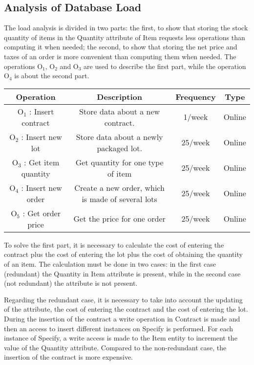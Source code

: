 \newpage
\subsection{Analysis of Database Load}
The load analysis is divided in two parts: the first, to show that storing the stock quantity of items in the Quantity attribute of Item requests less operations than computing it when needed; the second, to show that storing the net price and taxes of an order is more convenient than computing them when needed.
The operations $ \textrm{O}_\textrm{1} $, $ \textrm{O}_\textrm{2} $ and $ \textrm{O}_\textrm{3} $ are used to describe the first part, while the operation $ \textrm{O}_\textrm{4} $ is about the second part.
\begin{table}[!h]
	\begin{center}
		\begin{tabular}{ | c | c | c | c | }
			\hline
			\textbf{Operation} & \textbf{Description} & \textbf{Frequency} & \textbf{Type} \\ \hline
			$ \textrm{O}_\textrm{1} $ : Insert contract & Store data about a new contract. & 1/week & Online \\ \hline
			$ \textrm{O}_\textrm{2} $ : Insert new lot & Store data about a newly packaged lot. & 25/week & Online \\ \hline
			$ \textrm{O}_\textrm{3} $ : Get item quantity  & Get quantity for one type of item & 25/week & Online \\\hline
			$ \textrm{O}_\textrm{4} $ : Insert new order  & Create a new order, which is made of several lots & 25/week & Online \\\hline
			$ \textrm{O}_\textrm{5} $ : Get order price  & Get the price for one order & 25/week & Online \\\hline
		\end{tabular}
	\end{center}
\end{table}

To solve the first part, it is necessary to calculate the cost of entering the contract plus the cost of entering the lot plus the cost of obtaining the quantity of an item. The calculation must be done in two cases: in the first case (redundant) the Quantity in Item attribute is present, while in the second case (not redundant) the attribute is not present.

Regarding the redundant case, it is necessary to take into account the updating of the attribute, the cost of entering the contract and the cost of entering the lot.
During the insertion of the contract a write operation in Contract is made and then an access to insert different instances on Specify is performed. For each instance of Specify, a write access is made to the Item entity to increment the value of the Quantity attribute. Compared to the non-redundant case, the insertion of the contract is more expensive.

